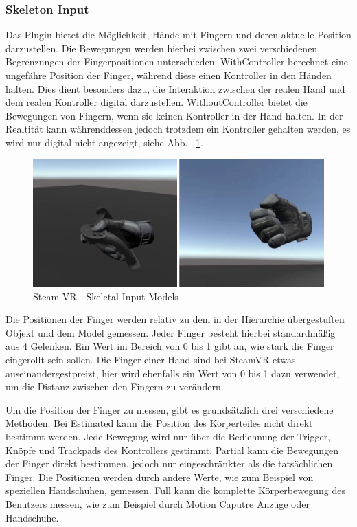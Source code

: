 \begin{itemize}
\subsubsection{Skeleton Input}
Das Plugin bietet die Möglichkeit, Hände mit Fingern und deren aktuelle Position darzustellen.
Die Bewegungen werden hierbei zwischen zwei verschiedenen Begrenzungen der Fingerpositionen unterschieden.
WithController berechnet eine ungefähre Position der Finger, während diese einen Kontroller in den Händen halten.
Dies dient besonders dazu, die Interaktion zwischen der realen Hand und dem realen Kontroller digital darzustellen.
WithoutController bietet die Bewegungen von Fingern, wenn sie keinen Kontroller in der Hand halten.
In der Realtität kann währenddessen jedoch trotzdem ein Kontroller gehalten werden, es wird nur digital nicht angezeigt, siehe Abb. ~\ref{fig:steamvr_skeletal_input_models}.
\begin {figure}
    \centering
    \includegraphics[scale=1]{pics/steamVR_skeletal_input_models}
    \caption{Steam VR - Skeletal Input Models}
    \label{fig:steamvr_skeletal_input_models}
\end {figure}
Die Positionen der Finger werden relativ zu dem in der Hierarchie übergestuften Objekt und dem Model gemessen.
Jeder Finger besteht hierbei standardmäßig aus 4 Gelenken.
Ein Wert im Bereich von 0 bis 1 gibt an, wie stark die Finger eingerollt sein sollen.
Die Finger einer Hand sind bei SteamVR etwas auseinandergestpreizt, hier wird ebenfalls ein Wert von 0 bis 1 dazu verwendet, um die Distanz zwischen den Fingern zu verändern.

Um die Position der Finger zu messen, gibt es grundsätzlich drei verschiedene Methoden.
Bei Estimated kann die Position des Körperteiles nicht direkt bestimmt werden.
Jede Bewegung wird nur über die Bediehnung der Trigger, Knöpfe und Trackpads des Kontrollers gestimmt.
Partial kann die Bewegungen der Finger direkt bestimmen, jedoch nur eingeschränkter als die tatsächlichen Finger.
Die Positionen werden durch andere Werte, wie zum Beispiel von speziellen Handschuhen, gemessen.
Full kann die komplette Körperbewegung des Benutzers messen, wie zum Beispiel durch Motion Caputre Anzüge oder Handschuhe.


\end{itemize}
